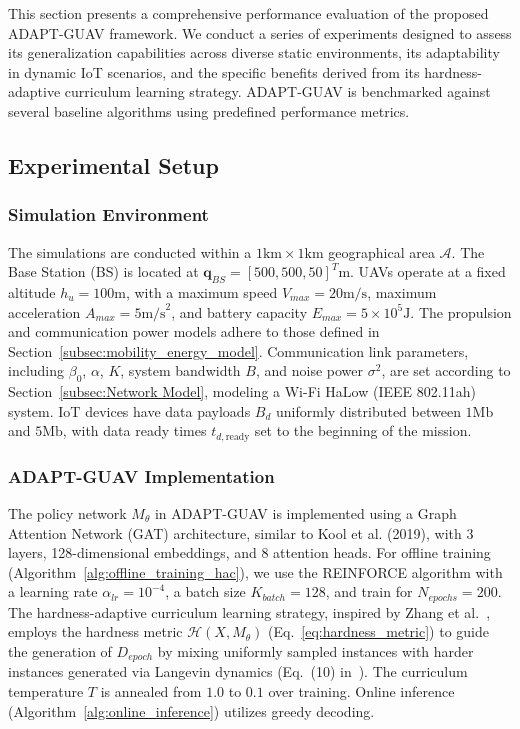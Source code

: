 \documentclass[10pt,conference,letterpaper]{IEEEtran}
\begin{document}
This section presents a comprehensive performance evaluation of the proposed ADAPT-GUAV framework. We conduct a series of experiments designed to assess its generalization capabilities across diverse static environments, its adaptability in dynamic IoT scenarios, and the specific benefits derived from its hardness-adaptive curriculum learning strategy. ADAPT-GUAV is benchmarked against several baseline algorithms using predefined performance metrics.

\subsection{Experimental Setup}
\label{subsec:exp_setup}

\subsubsection{Simulation Environment}
The simulations are conducted within a $1 \text{km} \times 1 \text{km}$ geographical area $\mathcal{A}$. The Base Station (BS) is located at $\mathbf{q}_{BS} = [500, 500, 50]^T \text{m}$. UAVs operate at a fixed altitude $h_u = 100 \text{m}$, with a maximum speed $V_{max} = 20 \text{m/s}$, maximum acceleration $A_{max} = 5 \text{m/s}^2$, and battery capacity $E_{max} = 5 \times 10^5 \text{J}$. The propulsion and communication power models adhere to those defined in Section~\ref{subsec:mobility_energy_model}. Communication link parameters, including $\beta_0$, $\alpha$, $K$, system bandwidth $B$, and noise power $\sigma^2$, are set according to Section~\ref{subsec:Network Model}, modeling a Wi-Fi HaLow (IEEE 802.11ah) system. IoT devices have data payloads $B_d$ uniformly distributed between $1 \text{Mb}$ and $5 \text{Mb}$, with data ready times $t_{d, \text{ready}}$ set to the beginning of the mission.

\subsubsection{ADAPT-GUAV Implementation}
The policy network $M_{\theta}$ in ADAPT-GUAV is implemented using a Graph Attention Network (GAT) architecture, similar to Kool et al. (2019), with 3 layers, 128-dimensional embeddings, and 8 attention heads.
For offline training (Algorithm~\ref{alg:offline_training_hac}), we use the REINFORCE algorithm with a learning rate $\alpha_{lr} = 10^{-4}$, a batch size $K_{batch} = 128$, and train for $N_{epochs} = 200$. The hardness-adaptive curriculum learning strategy, inspired by Zhang et al.~\cite{DBLP:conf/aaai/ZhangZW022}, employs the hardness metric $\mathcal{H}(X, M_{\theta})$ (Eq.~\eqref{eq:hardness_metric}) to guide the generation of $D_{epoch}$ by mixing uniformly sampled instances with harder instances generated via Langevin dynamics (Eq.~(10) in~\cite{DBLP:conf/aaai/ZhangZW022}). The curriculum temperature $T$ is annealed from $1.0$ to $0.1$ over training. Online inference (Algorithm~\ref{alg:online_inference}) utilizes greedy decoding.
\end{document}
